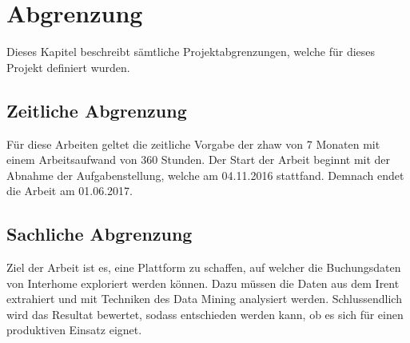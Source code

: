 %
	
					
					
					



\section{Abgrenzung}
\label{sec:einleitung:abgrenzung}
Dieses Kapitel beschreibt sämtliche Projektabgrenzungen, welche für dieses Projekt definiert
wurden.

\subsection{Zeitliche Abgrenzung}
Für diese Arbeiten geltet die zeitliche Vorgabe der \gls{zhaw} von 7 Monaten mit einem Arbeitsaufwand von 360 Stunden.
Der Start der Arbeit beginnt mit der Abnahme der Aufgabenstellung, welche am 04.11.2016 stattfand.
Demnach endet die Arbeit am 01.06.2017.

\subsection{Sachliche Abgrenzung}
Ziel der Arbeit ist es, eine Plattform zu schaffen, auf welcher die Buchungsdaten von Interhome exploriert werden können. Dazu müssen die Daten aus dem Irent extrahiert und mit Techniken des Data Mining analysiert werden. Schlussendlich wird das Resultat bewertet, sodass entschieden werden kann, ob es sich für einen produktiven Einsatz eignet.

